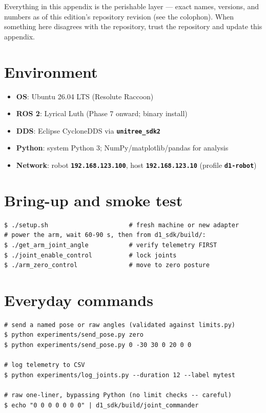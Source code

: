 \documentclass[11pt,twoside,openright]{book}
\newcommand{\code}[1]{\texttt{\bfseries #1}}
\begin{document}
Everything in this appendix is the perishable layer --- exact names,
versions, and numbers as of this edition's repository revision (see the
colophon). When something here disagrees with the repository, trust the
repository and update this appendix.

\section{Environment}

\begin{itemize}
  \item \textbf{OS}: Ubuntu 26.04 LTS (Resolute Raccoon)
  \item \textbf{ROS 2}: Lyrical Luth (Phase 7 onward; binary install)
  \item \textbf{DDS}: Eclipse CycloneDDS via \code{unitree\_sdk2}
  \item \textbf{Python}: system Python 3; NumPy/matplotlib/pandas for
    analysis
  \item \textbf{Network}: robot \code{192.168.123.100}, host
    \code{192.168.123.10} (profile \code{d1-robot})
\end{itemize}

\section{Bring-up and smoke test}

\begin{lstlisting}
$ ./setup.sh                      # fresh machine or new adapter
# power the arm, wait 60-90 s, then from d1_sdk/build/:
$ ./get_arm_joint_angle           # verify telemetry FIRST
$ ./joint_enable_control          # lock joints
$ ./arm_zero_control              # move to zero posture
\end{lstlisting}

\section{Everyday commands}

\begin{lstlisting}
# send a named pose or raw angles (validated against limits.py)
$ python experiments/send_pose.py zero
$ python experiments/send_pose.py 0 -30 30 0 20 0 0

# log telemetry to CSV
$ python experiments/log_joints.py --duration 12 --label mytest

# raw one-liner, bypassing Python (no limit checks -- careful)
$ echo "0 0 0 0 0 0 0" | d1_sdk/build/joint_commander
\end{lstlisting}
\end{document}
